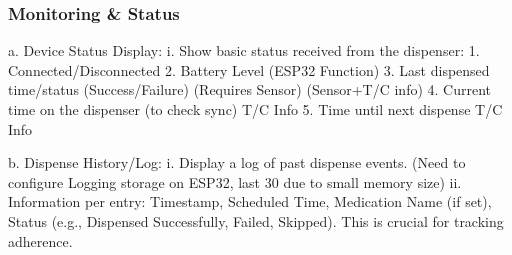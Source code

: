 \subsubsection{Monitoring \&  Status}

a. Device Status Display:
i. Show basic status received from the dispenser:
1. Connected/Disconnected
2. Battery Level (ESP32 Function)
3. Last dispensed time/status (Success/Failure) (Requires Sensor) (Sensor+T/C info)
4. Current time on the dispenser (to check sync) T/C Info
5. Time until next dispense T/C Info

b. Dispense History/Log:
i. Display a log of past dispense events. (Need to configure Logging storage on ESP32, last 30 due to small memory size)
ii. Information per entry: Timestamp, Scheduled Time, Medication Name (if set), Status (e.g., Dispensed Successfully, Failed, Skipped). This is crucial for tracking adherence.

